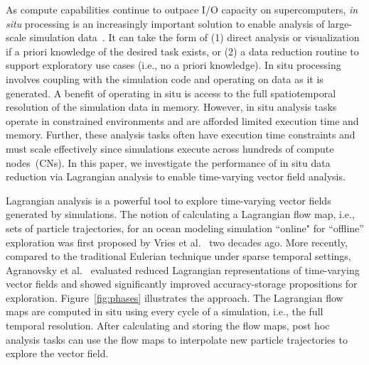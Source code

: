 As compute capabilities continue to outpace I/O capacity on supercomputers, \textit{in situ} processing is an increasingly important solution to enable analysis of large-scale simulation data~\cite{bauer2016situ}.
%
It can take the form of (1) direct analysis or visualization if a priori knowledge of the desired task exists, or (2) a data reduction routine to support exploratory use cases (i.e., no a priori knowledge). 
%
In situ processing involves coupling with the simulation code and operating on data as it is generated. 
%
A benefit of operating in situ is access to the full spatiotemporal resolution of the simulation data in memory.
%
However, in situ analysis tasks operate in constrained environments and are afforded limited execution time and memory.
%
Further, these analysis tasks often have execution time constraints and must scale effectively since simulations execute across hundreds of compute nodes~(CNs).
%
%
In this paper, we investigate the performance of in situ data reduction via Lagrangian analysis to enable time-varying vector field analysis.
%

Lagrangian analysis is a powerful tool to explore time-varying vector fields generated by simulations.
%
The notion of calculating a Lagrangian flow map, i.e., sets of particle trajectories, for an ocean modeling simulation ``online" for ``offline'' exploration was first proposed by Vries et al.~\cite{vries2001calculating} two decades ago.
%
More recently, compared to the traditional Eulerian technique under sparse temporal settings, Agranovsky et al.~\cite{agranovsky2014improved} evaluated reduced Lagrangian representations of time-varying vector fields and showed significantly improved accuracy-storage propositions for exploration. 
%
Figure~\ref{fig:phases} illustrates the approach.
%
The Lagrangian flow maps 
are computed in situ using every cycle of a simulation, i.e., the full temporal resolution.
%
After calculating and storing the flow maps, post hoc analysis tasks can use the flow maps to interpolate new particle trajectories to explore the vector field.
%
%



